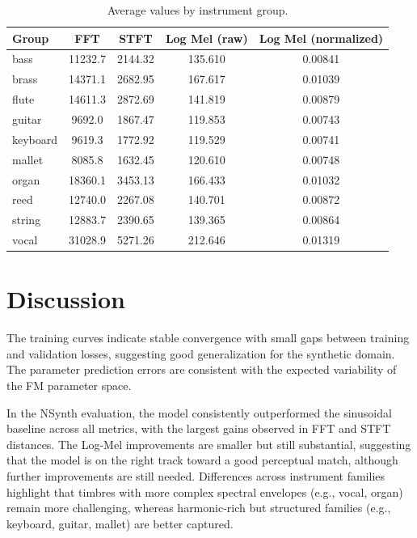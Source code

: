 \begin{table}[htb]
  \centering
  \small
  \caption{Average values by instrument group.}
  \label{tab:avg_metrics_groups}
  \begin{tabular}{l|c|c|c|c}
    \hline
    Group    & FFT     & STFT    & Log Mel (raw) & Log Mel (normalized) \\
    \hline
    bass     & 11232.7 & 2144.32 & 135.610       & 0.00841              \\
    brass    & 14371.1 & 2682.95 & 167.617       & 0.01039              \\
    flute    & 14611.3 & 2872.69 & 141.819       & 0.00879              \\
    guitar   & 9692.0  & 1867.47 & 119.853       & 0.00743              \\
    keyboard & 9619.3  & 1772.92 & 119.529       & 0.00741              \\
    mallet   & 8085.8  & 1632.45 & 120.610       & 0.00748              \\
    organ    & 18360.1 & 3453.13 & 166.433       & 0.01032              \\
    reed     & 12740.0 & 2267.08 & 140.701       & 0.00872              \\
    string   & 12883.7 & 2390.65 & 139.365       & 0.00864              \\
    vocal    & 31028.9 & 5271.26 & 212.646       & 0.01319              \\
    \hline
  \end{tabular}
\end{table}

\section{Discussion}

The training curves indicate stable convergence with small gaps between training and validation losses, suggesting good generalization for the synthetic domain. The parameter prediction errors are consistent with the expected variability of the FM parameter space.

In the NSynth evaluation, the model consistently outperformed the sinusoidal baseline across all metrics, with the largest gains observed in FFT and STFT distances. The Log-Mel improvements are smaller but still substantial, suggesting that the model is on the right track toward a good perceptual match, although further improvements are still needed. Differences across instrument families highlight that timbres with more complex spectral envelopes (e.g., vocal, organ) remain more challenging, whereas harmonic-rich but structured families (e.g., keyboard, guitar, mallet) are better captured.
